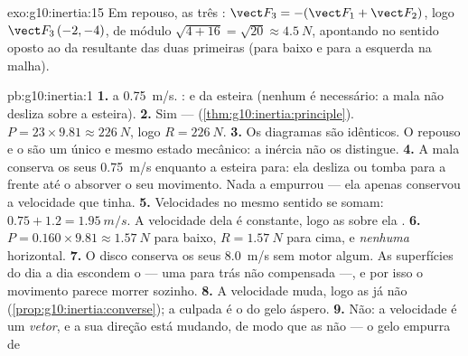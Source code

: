 \begin{solution}{exo:g10:inertia:15}
Em repouso, as três  :
$\vect F_3 = -(\vect F_1 + \vect F_2)$, logo $\vect F_3\,(-2, -4)$, de
módulo $\sqrt{4 + 16} = \sqrt{20} \approx \qty{4.5}{N}$, apontando no
sentido oposto ao da resultante das duas primeiras (para baixo e para a
esquerda na malha).
\end{solution}

\begin{solution}{pb:g10:inertia:1}
\textbf{1.}  a \qty{0.75}{m/s}. : 
e  da esteira (nenhum  é necessário: a mala não
desliza sobre a esteira).
\textbf{2.} Sim --- 
(\cref{thm:g10:inertia:principle}). $P = 23 \times 9.81 \approx
\qty{226}{N}$, logo $R = \qty{226}{N}$.
\textbf{3.} Os diagramas são idênticos. O repouso e o  são um único e mesmo estado mecânico: a inércia não os
distingue.
\textbf{4.} A mala conserva os seus \qty{0.75}{m/s} enquanto a esteira
para: ela desliza ou tomba para a frente até o  absorver o seu
movimento. Nada a empurrou --- ela apenas conservou a velocidade que
tinha.
\textbf{5.} Velocidades no mesmo sentido se somam:
$0.75 + 1.2 = \qty{1.95}{m/s}$. A velocidade dela é constante, logo as
 sobre ela .
\textbf{6.} $P = 0.160 \times 9.81 \approx \qty{1.57}{N}$ para baixo,
$R = \qty{1.57}{N}$ para cima, e \emph{nenhuma}  horizontal.
\textbf{7.} O disco conserva os seus \qty{8.0}{m/s} sem motor algum. As
superfícies do dia a dia escondem o  --- uma  para trás não
compensada ---, e por isso o movimento parece morrer sozinho.
\textbf{8.} A velocidade muda, logo as  já não 
(\cref{prop:g10:inertia:converse}); a culpada é o  do gelo áspero.
\textbf{9.} Não: a velocidade é um \emph{vetor}, e a sua direção está
mudando, de modo que as  não  --- o gelo empurra de

\end{solution}
